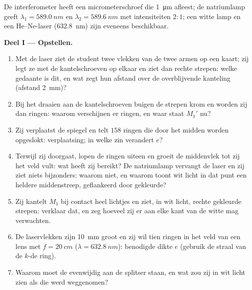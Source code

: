 \begin{problem}
\label{pb:b2:michelson:1}

De interferometer heeft een micrometerschroef die \qty{1}{\micro m} afleest; de
natriumlamp geeft $\lambda_1 = \qty{589.0}{nm}$ en $\lambda_2 = \qty{589.6}{nm}$ met
intensiteiten $2 : 1$; een witte lamp en een He--Ne-laser (\qty{632.8}{nm}) zijn
eveneens beschikbaar.

\medskip
\noindent\textbf{Deel I --- Opstellen.}
\begin{enumerate}
  \item Met de laser ziet de student twee vlekken van de twee armen op
        een kaart; zij legt ze met de kantelschroeven op elkaar en ziet dan
        rechte strepen: welke gedaante is dit, en wat zegt
        hun afstand over de overblijvende kanteling (afstand \qty{2}{mm})?
  \item Bij het draaien aan de kantelschroeven buigen de strepen krom en
        worden zij dan
        ringen: waarom verschijnen er ringen, en waar staat $M_1'$ nu?
  \item Zij verplaatst de spiegel en telt $158$ ringen die door het
        midden worden opgeslokt: verplaatsing; in welke zin verandert $e$?
  \item Terwijl zij doorgaat, lopen de ringen uiteen en groeit de middenvlek
        tot zij het veld vult: wat heeft zij bereikt? De natriumlamp
        vervangt de laser en zij ziet niets bijzonders: waarom niet, en
        waarom toont wit licht in dat punt een heldere middenstreep,
        geflankeerd door
        gekleurde?
  \item Zij kantelt $M_1$ bij contact heel lichtjes en ziet, in wit
        licht, rechte gekleurde strepen: verklaar dat, en zeg hoeveel
        zij er aan elke kant van de witte mag verwachten.
  \item De laservlekken zijn \qty{10}{mm} groot en zij wil tien ringen
        in het veld van een lens met $f = \qty{20}{cm}$
        ($\lambda = \qty{632.8}{nm}$):
        benodigde dikte $e$ (gebruik de straal van de $k$-de ring).
  \item Waarom moet de  evenwijdig aan de splitser staan,
        en wat zou zij in wit licht zien als die werd weggenomen?
\end{enumerate}


\end{problem}
